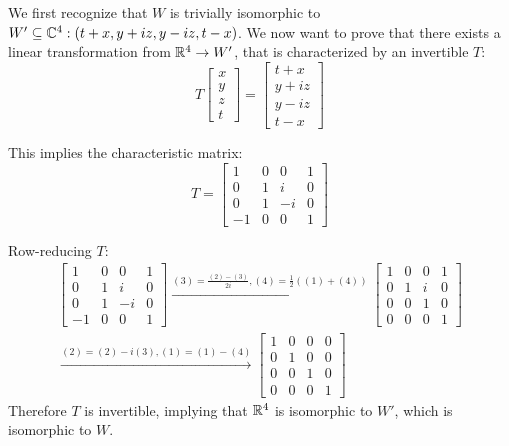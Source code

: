 \documentclass[a4paper, 11pt]{article}
\begin{document}
\begin{solution}
    We first recognize that \(W\) is trivially isomorphic to \(W'\subseteq \mathbb{C}^4: (t+x, y+iz, y-iz, t-x)\). We now want to prove that there exists a linear transformation from \(\mathbb{R}^4 \to W'\), that is characterized by an invertible \(T\): \[
    T \left[\begin{array}{c}
    x \\ y \\ z \\ t
    \end{array}\right] = \left[\begin{array}{c}
    t+x \\
    y+iz \\
    y-iz \\
    t-x
    \end{array}\right]
    \]

    This implies the characteristic matrix: \[
    T = \left[\begin{array}{cccc}
    1 & 0 & 0 & 1 \\
    0 & 1 & i & 0 \\
    0 & 1 & -i & 0 \\
    -1 & 0 & 0 & 1
    \end{array}\right]
    \]

    Row-reducing \(T\):
    \begin{multline*}
        \left[\begin{array}{cccc}
            1 & 0 & 0 & 1 \\
            0 & 1 & i & 0 \\
            0 & 1 & -i & 0 \\
            -1 & 0 & 0 & 1
            \end{array}\right] \xrightarrow{(3) = \frac{(2)-(3)}{2i}, (4) = \frac{1}{2} ((1) + (4))} \left[\begin{array}{cccc}
                1 & 0 & 0 & 1 \\
                0 & 1 & i & 0 \\
                0 & 0 & 1 & 0 \\
                0 & 0 & 0 & 1
            \end{array}\right]
            \\
            \xrightarrow{(2) = (2) - i(3), (1) = (1) - (4)} \left[\begin{array}{cccc}
                1 & 0 & 0 & 0 \\
                0 & 1 & 0 & 0 \\
                0 & 0 & 1 & 0 \\
                0 & 0 & 0 & 1
            \end{array}\right]
    \end{multline*}
    Therefore \(T\) is invertible, implying that \(\mathbb{R}^4\) is isomorphic to \(W'\), which is isomorphic to \(W\).
\end{solution}
\end{document}

